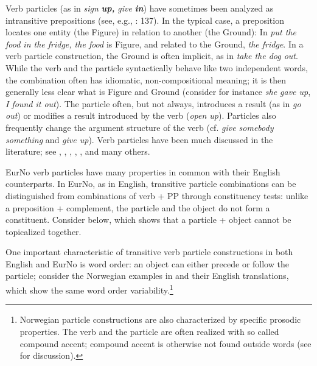 \documentclass[output=paper]{langscibook}
\begin{document}
Verb particles (as in \textit{sign} \textbf{\textit{up,}} \textit{give} \textbf{\textit{in}}) have sometimes been analyzed as intransitive prepositions (see, e.g., \citealt{Faarlund2019}: 137). In the typical case, a preposition locates one entity (the Figure) in relation to another (the Ground): In \textit{put the food in the fridge, the food} is Figure, and related to the Ground, \textit{the fridge}. In a verb particle construction, the Ground is often implicit, as in \textit{take the dog out}. While the verb and the particle syntactically behave like two independent words, the combination often has idiomatic, non-compositional meaning; it is then generally less clear what is Figure and Ground (consider for instance \textit{she gave up}, \textit{I found it out}). The particle often, but not always, introduces a result (as in \textit{go out}) or modifies a result introduced by the verb (\textit{open up}). Particles also frequently change the argument structure of the verb (cf. \textit{give somebody something} and \textit{give up}). Verb particles have been much discussed in the literature; see \citet{Åfarli1985}, \citet{Svenonius1996}, \citet{RamchandSvenonius2002}, \citet{Toivonen2003}, \citet{LarssonLundquist2014, LarssonLundquist2021}, \citet{Aa2020} and many others. 

EurNo verb particles have many properties in common with their English counterparts. In EurNo, as in English, transitive particle combinations can be distinguished from combinations of verb + PP through constituency tests: unlike a preposition + complement, the particle and the object do not form a constituent. Consider  below, which shows that a particle + object cannot be topicalized together.

\ea \label{ex:larsson:26}
\z
\z

One important characteristic of transitive verb particle constructions in both English and EurNo is word order: an object can either precede or follow the particle; consider the Norwegian examples in  and their English translations, which show the same word order variability.\footnote{Norwegian particle constructions are also characterized by specific prosodic properties. The verb and the particle are often realized with so called compound accent; compound accent is otherwise not found outside words (see \citealt{TengesdalForthcoming} for discussion).} 
\end{document}
